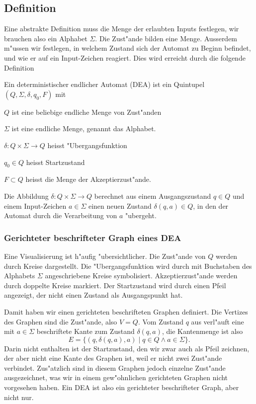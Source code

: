\subsection{Definition\label{regulaer:definition-dea}}
Eine abstrakte Definition muss die Menge der erlaubten Inputs
festlegen, wir brauchen also ein Alphabet $\Sigma$. Die Zust"ande
bilden eine Menge. Ausserdem m"ussen wir festlegen, in welchem Zustand
sich der Automat zu Beginn befindet, und wie er auf ein Input-Zeichen
reagiert. Dies wird erreicht durch die folgende Definition
\begin{definition}
Ein deterministischer endlicher Automat (DEA) ist ein Quintupel
$(Q,\Sigma,\delta, q_0,F)$ mit
\begin{compactenum}
\item $Q$ ist eine beliebige endliche Menge von Zust"anden
\item $\Sigma$ ist eine endliche Menge, genannt das Alphabet.
\item $\delta\colon Q\times\Sigma\to Q$ heisst "Ubergangsfunktion
\item $q_0\in Q$ heisst Startzustand
\item $F\subset Q$ heisst die Menge der Akzeptierzust"ande.
\end{compactenum}
\end{definition}
Die Abbildung $\delta\colon Q\times \Sigma\to Q$ berechnet
aus einem Ausgangszustand $q\in Q$ und einem Input-Zeichen $a\in\Sigma$
einen neuen Zustand $\delta(q,a)\in Q$, in den der Automat durch
die Verarbeitung von $a$ "ubergeht.

\subsubsection{Gerichteter beschrifteter Graph eines DEA}
Eine Visualisierung ist h"aufig "ubersichtlicher.
Die Zust"ande von $Q$ werden durch Kreise dargestellt. Die
"Ubergangsfunktion wird durch mit Buchstaben des Alphabets $\Sigma$
angeschriebene Kreise symbolisiert. Akzeptierzust"ande werden durch
doppelte Kreise markiert. Der Startzustand wird durch einen
Pfeil angezeigt, der nicht einen Zustand als Ausgangspunkt hat.

Damit haben wir einen gerichteten beschrifteten Graphen definiert.
Die Vertizes des Graphen sind die Zust"ande, also $V=Q$.
Vom Zustand $q$ aus verl"auft eine mit $a\in\Sigma$ beschriftete
Kante zum Zustand $\delta(q,a)$, 
die Kantenmenge
ist also
\[
E=\{(q,\delta(q,a),a)\;|\; q\in Q\wedge a\in\Sigma\}.
\]
Darin nicht enthalten ist der Startzustand, den wir zwar auch als
Pfeil zeichnen, der aber nicht eine Kante des Graphen ist, weil
er nicht zwei Zust"ande verbindet.
Zus"atzlich sind in diesem Graphen jedoch einzelne Zust"ande ausgezeichnet,
was wir in einem gew"ohnlichen gerichteten Graphen nicht vorgesehen
haben. Ein DEA ist also ein gerichteter beschrifteter Graph, aber nicht
nur.

